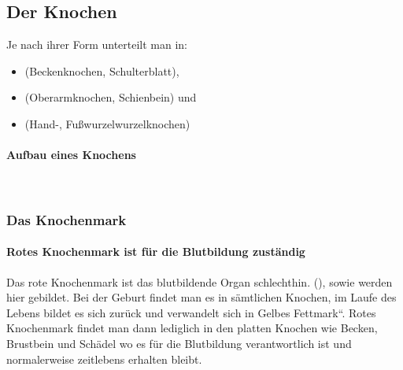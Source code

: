 \subsection{Der Knochen}

Je nach ihrer Form unterteilt man in: 
\begin{itemize}
    \item {} (Beckenknochen,
    Schulterblatt),
    \item {} (Oberarmknochen, Schienbein)
    und
    \item {} (Hand-, Fußwurzelwurzelknochen)
\end{itemize}

\paragraph{Aufbau eines Knochens}~


{
}

\subsubsection{Das Knochenmark}

\paragraph{Rotes Knochenmark ist f\"ur die Blutbildung
zust\"andig}

Das rote Knochenmark ist das blutbildende Organ
schlechthin.  (),
  sowie
  werden hier
gebildet. Bei der Geburt findet man es in s\"amtlichen Knochen, im Laufe des Lebens bildet es sich zur\"uck und verwandelt sich in
{\quotedblbase}Gelbes Fettmark{\textquotedblleft}. Rotes Knochenmark
findet man dann lediglich in den platten Knochen wie Becken, Brustbein
und Sch\"adel wo es f\"ur die Blutbildung verantwortlich ist und
normalerweise zeitlebens erhalten bleibt. 

